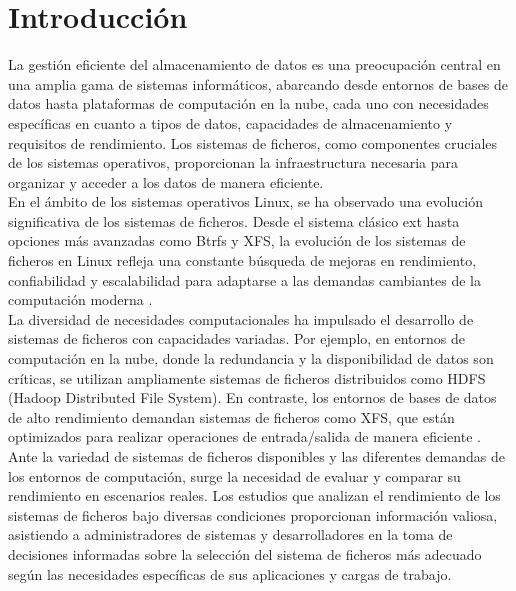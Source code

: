 \chapter{Introducción}\label{sec:capítulo_1}

La gestión eficiente del almacenamiento de datos es una preocupación central en una amplia gama de sistemas informáticos, abarcando desde entornos de bases de datos hasta plataformas de computación en la nube, cada uno con necesidades específicas en cuanto a tipos de datos, capacidades de almacenamiento y requisitos de rendimiento. Los sistemas de ficheros, como componentes cruciales de los sistemas operativos, proporcionan la infraestructura necesaria para organizar y acceder a los datos de manera eficiente.\\

En el ámbito de los sistemas operativos Linux, se ha observado una evolución significativa de los sistemas de ficheros. Desde el sistema clásico ext hasta opciones más avanzadas como Btrfs y XFS, la evolución de los sistemas de ficheros en Linux refleja una constante búsqueda de mejoras en rendimiento, confiabilidad y escalabilidad para adaptarse a las demandas cambiantes de la computación moderna \cite{ext4-wiki,btrfs-docs,xfs-wiki}.\\

La diversidad de necesidades computacionales ha impulsado el desarrollo de sistemas de ficheros con capacidades variadas. Por ejemplo, en entornos de computación en la nube, donde la redundancia y la disponibilidad de datos son críticas, se utilizan ampliamente sistemas de ficheros distribuidos como HDFS (Hadoop Distributed File System). En contraste, los entornos de bases de datos de alto rendimiento demandan sistemas de ficheros como XFS, que están optimizados para realizar operaciones de entrada/salida de manera eficiente \cite{hdfs-wiki,xfs-wiki}.\\

Ante la variedad de sistemas de ficheros disponibles y las diferentes demandas de los entornos de computación, surge la necesidad de evaluar y comparar su rendimiento en escenarios reales. Los estudios que analizan el rendimiento de los sistemas de ficheros bajo diversas condiciones proporcionan información valiosa, asistiendo a administradores de sistemas y desarrolladores en la toma de decisiones informadas sobre la selección del sistema de ficheros más adecuado según las necesidades específicas de sus aplicaciones y cargas de trabajo.\\


